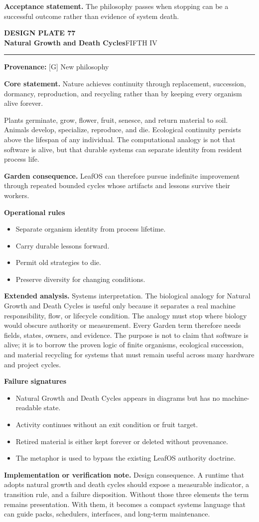 \documentclass[10pt,letterpaper,oneside]{article}
\newcommand{\prov}[1]{\textcolor{gardenBlue}{\sffamily\footnotesize\textbf{Provenance:} #1}}
\newcommand{\platetitle}[3]{%
  \begin{minipage}[t][0.54in][t]{\textwidth}
  {\sffamily\bfseries\color{gardenDeep}\fontsize{9}{10}\selectfont DESIGN PLATE #1}\\[-1pt]
  {\sffamily\bfseries\color{gardenInk}\fontsize{16.5}{18}\selectfont #2}\hfill{\sffamily\color{gardenGreen}\large #3}
  \end{minipage}\vspace{-2pt}\hrule\vspace{5pt}}
\begin{document}
\begin{acceptbox}
\textbf{Acceptance statement.} The philosophy passes when stopping can be a successful outcome rather than evidence of system death.
\end{acceptbox}
\newpage
\platetitle{77}{Natural Growth and Death Cycles}{FIFTH IV}
\prov{[G] New philosophy}
\fontsize{8.85}{10.45}\selectfont
\begin{corebox}
\textbf{Core statement.} Nature achieves continuity through replacement, succession, dormancy, reproduction, and recycling rather than by keeping every organism alive forever.
\end{corebox}
Plants germinate, grow, flower, fruit, senesce, and return material to soil. Animals develop, specialize, reproduce, and die. Ecological continuity persists above the lifespan of any individual. The computational analogy is not that software is alive, but that durable systems can separate identity from resident process life.

\textbf{Garden consequence.} LeafOS can therefore pursue indefinite improvement through repeated bounded cycles whose artifacts and lessons survive their workers.

\textbf{Operational rules}
\begin{itemize}
\item Separate organism identity from process lifetime.
\item Carry durable lessons forward.
\item Permit old strategies to die.
\item Preserve diversity for changing conditions.
\end{itemize}
\textbf{Extended analysis.} Systems interpretation. The biological analogy for Natural Growth and Death Cycles is useful only because it separates a real machine responsibility, flow, or lifecycle condition. The analogy must stop where biology would obscure authority or measurement. Every Garden term therefore needs fields, states, owners, and evidence. The purpose is not to claim that software is alive; it is to borrow the proven logic of finite organisms, ecological succession, and material recycling for systems that must remain useful across many hardware and project cycles.

\textbf{Failure signatures}
\begin{itemize}
\item Natural Growth and Death Cycles appears in diagrams but has no machine-readable state.
\item Activity continues without an exit condition or fruit target.
\item Retired material is either kept forever or deleted without provenance.
\item The metaphor is used to bypass the existing LeafOS authority doctrine.
\end{itemize}
\textbf{Implementation or verification note.} Design consequence. A runtime that adopts natural growth and death cycles should expose a measurable indicator, a transition rule, and a failure disposition. Without those three elements the term remains presentation. With them, it becomes a compact systems language that can guide packs, schedulers, interfaces, and long-term maintenance.
\end{document}
